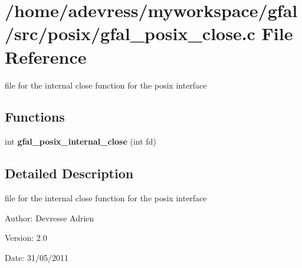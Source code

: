 \section{/home/adevress/myworkspace/gfal/src/posix/gfal\_\-posix\_\-close.c File Reference}
\label{gfal__posix__close_8c}
file for the internal close function for the posix interface 

\subsection*{Functions}
\begin{CompactItemize}
\item 
int \textbf{gfal\_\-posix\_\-internal\_\-close} (int fd)\label{gfal__posix__close_8c_9cfa5dfe3dff862999ce8f5c5b62a0c4}

\end{CompactItemize}


\subsection{Detailed Description}
file for the internal close function for the posix interface 

\begin{Desc}
\item[Author:]Devresse Adrien \end{Desc}
\begin{Desc}
\item[Version:]2.0 \end{Desc}
\begin{Desc}
\item[Date:]31/05/2011 \end{Desc}
